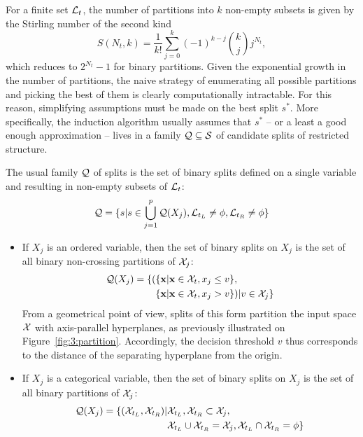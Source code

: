 For a finite set ${\cal L}_t$, the number of partitions into $k$
non-empty subsets is given by the Stirling number of the second
kind~\citep{knuth:1992}
\begin{equation}
S(N_t, k) = \frac{1}{k!} \sum_{j=0}^k (-1)^{k-j} {k\choose j} j^{N_t},
\end{equation}
which reduces to $2^{N_t}-1$ for binary partitions. Given the exponential
growth in the number of partitions, the naive strategy of enumerating all
possible partitions and picking the best of them is clearly computationally
intractable. For this reason, simplifying  assumptions must be made on the best
split $s^*$. More specifically, the induction algorithm usually assumes that
$s^*$ -- or a least a good enough approximation -- lives in a family ${\cal Q}
\subseteq {\cal S}$ of candidate splits of restricted structure.

The usual family ${\cal Q}$ of
splits is the set of binary splits defined on a single variable and resulting
in non-empty subsets of ${\cal L}_t$:
\begin{equation}\label{eqn:q:single-variables}
{\cal Q} = \{s | s \in \bigcup_{j=1}^p {\cal Q}(X_j), {\cal L}_{t_L} \neq \phi, {\cal L}_{t_R} \neq \phi \}
\end{equation}
\begin{itemize}
\item If $X_j$ is an ordered variable, then the set of binary splits on $X_j$ is the set
of all binary non-crossing partitions of ${\cal X}_j$:
\begin{align}
{\cal Q}(X_j) = \{ (&\{ \mathbf{x} | \mathbf{x} \in {\cal X}_t, x_j \leq v \}, \nonumber \\
                    &\{ \mathbf{x} | \mathbf{x} \in {\cal X}_t, x_j > v \}) | v \in {\cal X}_j \} \label{eqn:q:ordered}
\end{align}
From a geometrical point of view, splits of this form partition the input space
${\cal X}$ with axis-parallel hyperplanes, as previously illustrated on
Figure~\ref{fig:3:partition}. Accordingly, the decision threshold $v$ thus
corresponds to the distance of the separating hyperplane from the origin.
\item If $X_j$ is a categorical variable, then the set of binary splits on
$X_j$ is the set of all binary partitions of ${\cal X}_j$:
\begin{align}\label{eqn:q:categorical-cart}
{\cal Q}(X_j) = \{ ({\cal X}_{t_L}, {\cal X}_{t_R}) |& {\cal X}_{t_L}, {\cal X}_{t_R} \subset {\cal X}_j, \nonumber \\
                                             & {\cal X}_{t_L} \cup {\cal X}_{t_R} = {\cal X}_j, {\cal X}_{t_L} \cap {\cal X}_{t_R} = \phi \}
\end{align}
\end{itemize}

